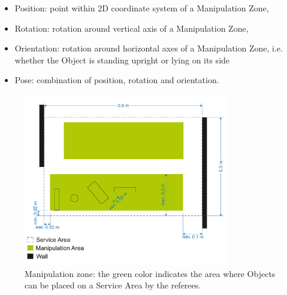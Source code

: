 \begin{itemize}
	\item Position: point within 2D coordinate system of a Manipulation Zone,
	\item Rotation: rotation around vertical axis of a Manipulation Zone,
	\item Orientation: rotation around horizontal axes of a Manipulation Zone, i.e. whether the Object is standing upright or lying on its side
	\item Pose: combination of position, rotation and orientation.
\end{itemize}
\begin{figure} [h!]
	\centering
	\includegraphics[width=0.8\textwidth ]{./images/manipulation_zone2023.pdf}
	\caption{Manipulation zone: the green color indicates the area where Objects can be placed on a Service Area by the referees.}
	\label{fig:manipulation_zone}
\end{figure}










